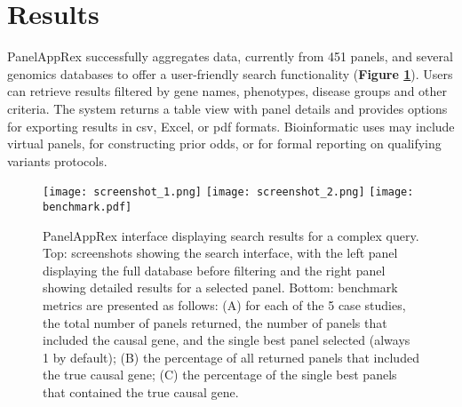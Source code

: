 \section{Results}
\noindent
PanelAppRex successfully aggregates data, currently from 451 panels, and several genomics databases to offer a user-friendly search functionality (\textbf{Figure \ref{fig:performance}}).
Users can retrieve results filtered by gene names, phenotypes, disease groups and other criteria. The system returns a table view with panel details and provides options for exporting results in \ac{csv}, Excel, or \ac{pdf} formats.
Bioinformatic uses may include virtual panels, for constructing prior odds, or for formal reporting on qualifying variants protocols.

\begin{figure}[ht]
    \centering
    \texttt{[image: screenshot\_1.png]}
    \texttt{[image: screenshot\_2.png]}    
    \texttt{[image: benchmark.pdf]}    

\caption{PanelAppRex interface displaying search results for a complex query. Top: screenshots showing the search interface, with the left panel displaying the full database before filtering and the right panel showing detailed results for a selected panel. Bottom: benchmark metrics are presented as follows: (A) for each of the 5 case studies, the total number of panels returned, the number of panels that included the causal gene, and the single best panel selected (always 1 by default); (B) the percentage of all returned panels that included the true causal gene; (C) the percentage of the single best panels that contained the true causal gene.}


    \label{fig:performance}
\end{figure}

